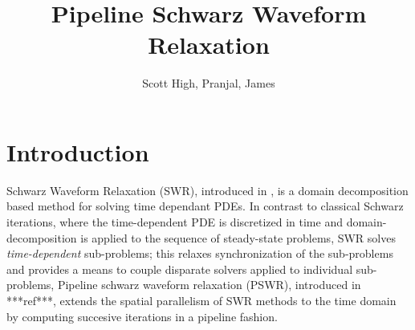 \documentclass{svmult-ddm}
\begin{document}
\title*{Pipeline Schwarz Waveform Relaxation}

\author{Scott High, Pranjal, James}

\maketitle



\section{Introduction}
\label{prop_sec:introduction}

Schwarz Waveform Relaxation (SWR), introduced in \cite{bjorhus1995},
is a domain decomposition based method for solving time dependant
PDEs.
In contrast to classical Schwarz iterations, where
the time-dependent PDE is discretized in time and domain-decomposition
is applied to the sequence of steady-state problems, SWR solves {\em
  time-dependent} sub-problems; this relaxes synchronization of the
sub-problems and provides a means to couple disparate solvers applied
to individual sub-problems,
Pipeline schwarz waveform relaxation (PSWR), introduced in ***ref***,
extends the spatial parallelism of SWR methods to the time domain by
computing succesive iterations in a pipeline fashion.
\end{document}
